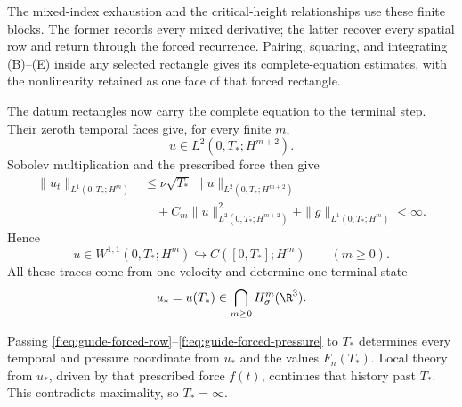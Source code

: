 The mixed-index exhaustion and the critical-height relationships use these
finite blocks.  The former records every mixed derivative; the
latter recover every spatial row and return through the forced recurrence.
Pairing, squaring, and integrating (B)--(E) inside any selected rectangle gives
its complete-equation estimates, with the nonlinearity retained as one face of
that forced rectangle.

\label{f:guide:finite-estimates}
The datum rectangles now carry the complete equation to the terminal
step.  Their zeroth temporal faces give, for every finite \(m\),
\[
 u\in L^2(0,T_*;H^{m+2}).
\]
Sobolev multiplication and the prescribed force then give
\begin{align*}
 \|u_t\|_{L^1(0,T_*;H^m)}
 &\le \nu\sqrt{T_*}\,\|u\|_{L^2(0,T_*;H^{m+2})}\\
 &\quad+C_m\|u\|_{L^2(0,T_*;H^{m+2})}^2
 +\|g\|_{L^1(0,T_*;H^m)}<\infty.
\end{align*}
Hence
\[
 u\in W^{1,1}(0,T_*;H^m)
 \hookrightarrow C([0,T_*];H^m)
 \qquad(m\ge0).
\]
All these traces come from one velocity and determine one
terminal state
\[
 u_*=u(T_*)\in\bigcap_{m\ge0}H^m_\sigma(\R^3).
\]

Passing \eqref{f:eq:guide-forced-row}--\eqref{f:eq:guide-forced-pressure} to
\(T_*\) determines every temporal and pressure coordinate from \(u_*\) and
the values \(F_n(T_*)\).  Local theory from \(u_*\), driven by that
prescribed force \(f(t)\), continues that history past \(T_*\).
This contradicts maximality, so \(T_*=\infty\).

\label{f:guide:how-proof-ends}

